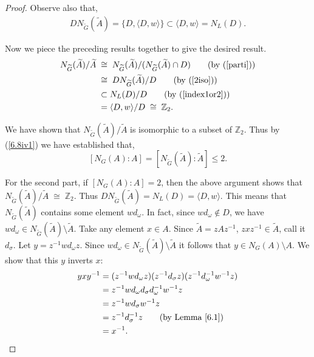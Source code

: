 \begin{proof}
Observe also that, 
\begin{align}\label{index1or2} DN_{\widetilde{G}}({\widetilde{A}}) = \{ D, \langle D, w \rangle \} \subset \langle D, w \rangle = N_L(D).
\end{align}

Now we piece the preceding results together to give the desired result.
\begin{align*}  N_{\widetilde{G}}({\widetilde{A}}) / {\widetilde{A}} \; & \cong \;  N_{\widetilde{G}}({\widetilde{A}})/( N_{\widetilde{G}}({\widetilde{A}}) \cap D) \tag{by (\ref{parti})}
\\ & \cong \; DN_{\widetilde{G}}({\widetilde{A}}) / D \tag{by (\ref{2iso})}
\\ & \subset N_L(D) / D \tag{by (\ref{index1or2})}
\\ &= \langle D, w \rangle / D \; \cong \; \mathbb{Z}_2.
\end{align*}

We have shown that $N_{\widetilde{G}}({\widetilde{A}}) / {\widetilde{A}}$ is isomorphic to a subset of $\mathbb{Z}_2$. Thus by (\ref{6.8iv1}) we have established that, $$[N_G(A): A] = [N_{\widetilde{G}}({\widetilde{A}}): {\widetilde{A}}] \leq 2.$$
\vspace{-2mm}

For the second part, if $[N_G(A): A] = 2$, then the above argument shows that $N_{\widetilde{G}}({\widetilde{A}}) / {\widetilde{A}} \; \cong \; \mathbb{Z}_2$. Thus $DN_{\widetilde{G}}({\widetilde{A}}) = N_L(D) = \langle D, w \rangle$. This means that $N_{\widetilde{G}}({\widetilde{A}})$ contains some element $wd_\omega$. In fact, since $w d_\omega \not \in D$, we have $w d_\omega \in N_{\widetilde{G}}({\widetilde{A}}) \! \setminus \! {\widetilde{A}}$. Take any element $x \in A$. Since ${\widetilde{A}} = zAz^{-1}$, $zxz^{-1} \in {\widetilde{A}}$, call it $d_\sigma$. Let $y = z^{-1}w d_\omega z$. Since $wd_\omega \in N_{\widetilde{G}}({\widetilde{A}}) \! \setminus \! {\widetilde{A}}$ it follows that $y \in N_G(A)\! \setminus \! A$. We show that this $y$ inverts $x$:
\begin{align*} yxy^{-1} &= (z^{-1}w d_\omega z)(z^{-1} d_\sigma z)(z^{-1}d^{-1}_\omega w^{-1} z)
\\ &= z^{-1} w d_\omega  d_\sigma d^{-1}_\omega w^{-1} z
\\ &=  z^{-1} w  d_\sigma  w^{-1} z 
\\ &=  z^{-1}  d^{-1}_\sigma z  \tag{by Lemma \ref{6.1}}
\\ &= x^{-1}.
\end{align*}


\end{proof}
